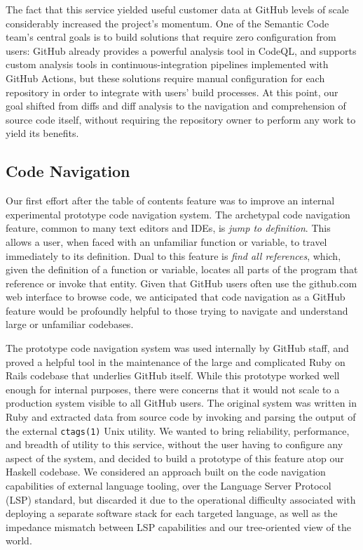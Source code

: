 \documentclass[acmsmall,fleqn,12pt]{acmart}
\begin{document}
The fact that this service yielded useful customer data at GitHub levels of
scale considerably increased the project's momentum. One of the Semantic Code
team's central goals is to build solutions that require zero configuration from
users: GitHub already provides a powerful analysis tool in CodeQL, and supports
custom analysis tools in continuous-integration pipelines implemented with
GitHub Actions, but these solutions require manual configuration for each
repository in order to integrate with users' build processes. At this point, our
goal shifted from diffs and diff analysis to the navigation and comprehension of
source code itself, without requiring the repository owner to perform any work
to yield its benefits.

\subsection{Code Navigation}

Our first effort after the table of contents feature was to improve an internal
experimental prototype code navigation system. The archetypal code navigation
feature, common to many text editors and IDEs, is \emph{jump to definition}.
This allows a user, when faced with an unfamiliar function or variable, to
travel immediately to its definition. Dual to this feature is \emph{find all
  references}, which, given the definition of a function or variable, locates
all parts of the program that reference or invoke that entity. Given that GitHub
users often use the \textsf{github.com} web interface to browse code, we
anticipated that code navigation as a GitHub feature would be profoundly helpful
to those trying to navigate and understand large or unfamiliar codebases.

The prototype code navigation system was used internally by GitHub staff, and
proved a helpful tool in the maintenance of the large and complicated Ruby on
Rails codebase that underlies GitHub itself. While this prototype worked well
enough for internal purposes, there were concerns that it would not scale to a
production system visible to all GitHub users. The original system was written
in Ruby and extracted data from source code by invoking and parsing the output
of the external \texttt{ctags(1)} Unix utility. We wanted to bring reliability,
performance, and breadth of utility to this service, without the user having to
configure any aspect of the system, and decided to build a prototype of this
feature atop our Haskell codebase. We considered an approach built on the code
navigation capabilities of external language tooling, over the Language Server
Protocol (LSP) standard, but discarded it due to the operational difficulty
associated with deploying a separate software stack for each targeted language,
as well as the impedance mismatch between LSP capabilities and our tree-oriented
view of the world.
\end{document}
